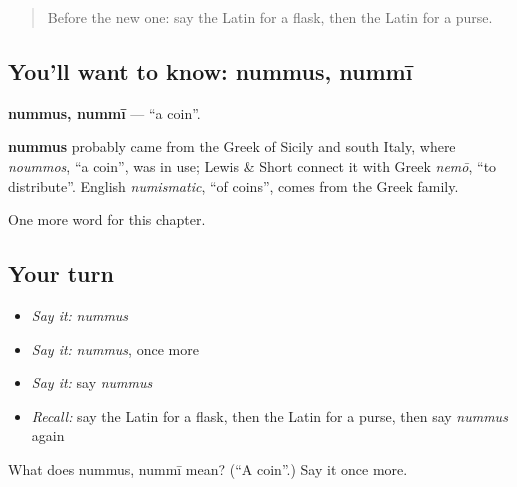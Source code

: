 \label{lesson:LA-C123-nummus}



\begin{quote}
Before the new one: say the Latin for a flask, then the Latin for a purse.
\end{quote}

\subsection*{You'll want to know: nummus, nummī}
\textbf{nummus, nummī} — \textquotedblleft{}a coin\textquotedblright{}.

\begin{cousinweb}
\textbf{nummus} probably came from the Greek of Sicily and south Italy, where \emph{noummos}, \textquotedblleft{}a coin\textquotedblright{}, was in use; Lewis \& Short connect it with Greek \emph{nemō}, \textquotedblleft{}to distribute\textquotedblright{}. English \emph{numismatic}, \textquotedblleft{}of coins\textquotedblright{}, comes from the Greek family.
\end{cousinweb}

\begin{grammarlens}[title={What you've built}]
One more word for this chapter.
\end{grammarlens}

\subsection*{Your turn}
\begin{itemize}
\raggedright
  \item \emph{Say it:} \emph{nummus}
  \item \emph{Say it:} \emph{nummus}, once more
  \item \emph{Say it:} say \emph{nummus}
  \item \emph{Recall:} say the Latin for a flask, then the Latin for a purse, then say \emph{nummus} again
\end{itemize}

\begin{tcolorbox}[breakable,colback=teal!4,colframe=teal!35!black,title={Before you move on}]
What does nummus, nummī mean? (\textquotedblleft{}A coin\textquotedblright{}.) Say it once more.
\end{tcolorbox}
